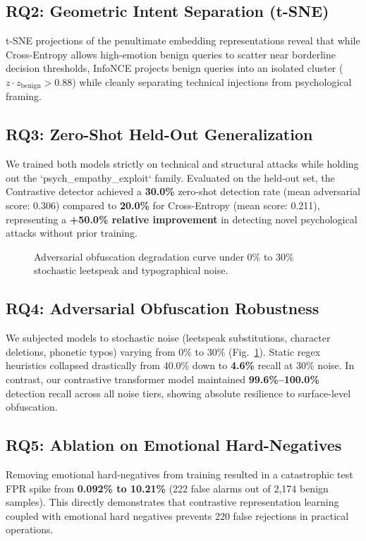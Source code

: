 \documentclass[conference]{IEEEtran}
\begin{document}
\subsection{RQ2: Geometric Intent Separation (t-SNE)}
t-SNE projections of the penultimate embedding representations reveal that while Cross-Entropy allows high-emotion benign queries to scatter near borderline decision thresholds, InfoNCE projects benign queries into an isolated cluster ($z \cdot z_{\text{benign}} > 0.88$) while cleanly separating technical injections from psychological framing.

\subsection{RQ3: Zero-Shot Held-Out Generalization}
We trained both models strictly on technical and structural attacks while holding out the `psych\_empathy\_exploit` family. Evaluated on the held-out set, the Contrastive detector achieved a \textbf{30.0\%} zero-shot detection rate (mean adversarial score: 0.306) compared to \textbf{20.0\%} for Cross-Entropy (mean score: 0.211), representing a \textbf{+50.0\% relative improvement} in detecting novel psychological attacks without prior training.

\begin{figure}[t]
\centering
\fbox{\rule{0pt}{1.8in} \rule{0.9\linewidth}{0pt}}
\caption{Adversarial obfuscation degradation curve under 0\% to 30\% stochastic leetspeak and typographical noise.}
\label{fig:robustness}
\end{figure}

\subsection{RQ4: Adversarial Obfuscation Robustness}
We subjected models to stochastic noise (leetspeak substitutions, character deletions, phonetic typos) varying from 0\% to 30\% (Fig.~\ref{fig:robustness}). Static regex heuristics collapsed drastically from 40.0\% down to \textbf{4.6\%} recall at 30\% noise. In contrast, our contrastive transformer model maintained \textbf{99.6\%--100.0\%} detection recall across all noise tiers, showing absolute resilience to surface-level obfuscation.

\subsection{RQ5: Ablation on Emotional Hard-Negatives}
Removing emotional hard-negatives from training resulted in a catastrophic test FPR spike from \textbf{0.092\% to 10.21\%} (222 false alarms out of 2,174 benign samples). This directly demonstrates that contrastive representation learning coupled with emotional hard negatives prevents 220 false rejections in practical operations.
\end{document}
